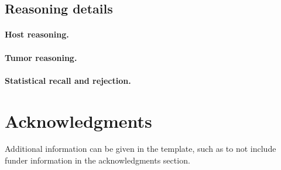 \documentclass[fleqn,10pt]{olplainarticle}
\begin{document}
\subsection{Reasoning details}
\paragraph{Host reasoning.}

\paragraph{Tumor reasoning.}

\paragraph{Statistical recall and rejection.}

\section*{Acknowledgments}

Additional information can be given in the template, such as to not include funder information in the acknowledgments section.


\end{document}
